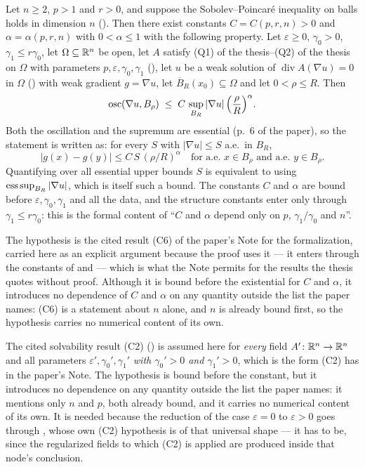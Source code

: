 \begin{theorem}[Theorem 2]
Let $n\ge2$, $p>1$ and $r>0$, and suppose the Sobolev--Poincar\'e inequality on balls holds in dimension $n$
().  Then there exist constants $C=C(p,r,n)>0$ and
$\alpha=\alpha(p,r,n)$ with $0<\alpha\le1$ with the following property.  Let
$\varepsilon\ge0$, $\gamma_0>0$, $\gamma_1\le r\gamma_0$, let
$\Omega\subseteq\mathbb{R}^n$ be open, let $A$ satisfy (Q1) of the thesis--(Q2) of the thesis on
$\Omega$ with parameters $p,\varepsilon,\gamma_0,\gamma_1$
(), let $u$ be a weak solution of
$\operatorname{div}A(\nabla u)=0$ in $\Omega$ () with
weak gradient $g=\nabla u$, let $\overline B_R(x_0)\subseteq\Omega$ and let
$0<\rho\le R$.  Then
\[
\operatorname*{osc}(\nabla u,B_\rho)\;\le\;C\,\sup_{B_R}|\nabla u|\,
\Bigl(\frac\rho R\Bigr)^{\alpha}.
\]
Both the oscillation and the supremum are essential (p.~6 of the paper), so the
statement is written as: for every $S$ with $|\nabla u|\le S$ a.e.\ in $B_R$,
\[
|g(x)-g(y)|\le C\,S\,(\rho/R)^{\alpha}
\quad\text{for a.e.\ }x\in B_\rho\text{ and a.e.\ }y\in B_\rho .
\]
Quantifying over all essential upper bounds $S$ is equivalent to using
$\operatorname*{ess\,sup}_{B_R}|\nabla u|$, which is itself such a bound.  The constants $C$ and
$\alpha$ are bound before $\varepsilon,\gamma_0,\gamma_1$ and all the data, and
the structure constants enter only through $\gamma_1\le r\gamma_0$: this is the
formal content of ``$C$ and $\alpha$ depend only on $p$, $\gamma_1/\gamma_0$ and
$n$''.

The hypothesis  is the cited result (C6) of the
paper's Note for the formalization, carried here as an explicit argument because
the proof uses it --- it enters through the constants of  and  --- which is what the
Note permits for the results the thesis quotes without proof.  Although it is
bound before the existential for $C$ and $\alpha$, it introduces no dependence of
$C$ and $\alpha$ on any quantity outside the list the paper names: (C6) is a statement
about $n$ alone, and $n$ is already bound first, so the hypothesis carries no
numerical content of its own.

The cited solvability result (C2) () is assumed here
for \emph{every} field $A'\colon\mathbb{R}^n\to\mathbb{R}^n$ and all parameters
$\varepsilon',\gamma_0',\gamma_1'$ \emph{with $\gamma_0'>0$ and $\gamma_1'>0$},
which is the form (C2) has in the paper's Note.  The hypothesis is bound before the constant, but it introduces no
dependence on any quantity outside the list the paper names: it mentions only
$n$ and $p$, both already bound, and it carries no numerical content of its own.
It is needed because the reduction of the case $\varepsilon=0$ to
$\varepsilon>0$ goes through , whose own (C2)
hypothesis is of that universal shape --- it has to be, since the regularized
fields to which (C2) is applied are produced inside that node's conclusion.


\end{theorem}

